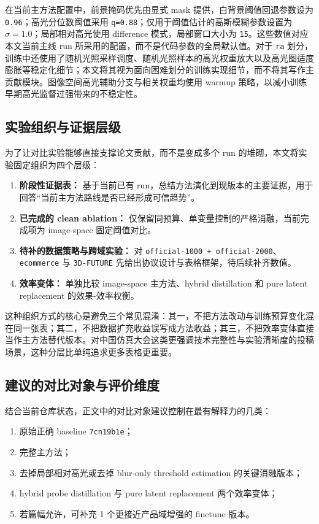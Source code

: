 \documentclass[UTF8,a4paper]{ctexart}
\begin{document}
在当前主方法配置中，前景掩码优先由显式 mask 提供，白背景阈值回退参数设为 \texttt{0.96}；高光分位数阈值采用 \texttt{q=0.88}；仅用于阈值估计的高斯模糊参数设置为 $\sigma=1.0$；局部相对高光使用 difference 模式，局部窗口大小为 \texttt{15}。这些数值对应本文当前主线 run 所采用的配置，而不是代码参数的全局默认值。对于 \texttt{ra} 划分，训练中还使用了随机光照采样调度、随机光照样本的高光权重放大以及高光图适度膨胀等稳定化细节；本文将其视为面向困难划分的训练实现细节，而不将其写作主贡献模块。图像空间高光辅助分支与相关权重均使用 warmup 策略，以减小训练早期高光监督过强带来的不稳定性。

\subsection{实验组织与证据层级}

为了让对比实验能够直接支撑论文贡献，而不是变成多个 run 的堆砌，本文将实验固定组织为四个层级：

\begin{enumerate}
\item \textbf{阶段性证据表：} 基于当前已有 run，总结方法演化到现版本的主要证据，用于回答“当前主方法路线是否已经形成可信趋势”。
\item \textbf{已完成的 clean ablation：} 仅保留同预算、单变量控制的严格消融，当前完成项为 image-space 固定阈值对比。
\item \textbf{待补的数据策略与跨域实验：} 对 \texttt{official-1000 + official-2000}、\texttt{ecommerce} 与 \texttt{3D-FUTURE} 先给出协议设计与表格框架，待后续补齐数值。
\item \textbf{效率变体：} 单独比较 image-space 主方法、hybrid distillation 和 pure latent replacement 的效果-效率权衡。
\end{enumerate}

这种组织方式的核心是避免三个常见混淆：其一，不把方法改动与训练预算变化混在同一张表；其二，不把数据扩充收益误写成方法收益；其三，不把效率变体直接当作主方法替代版本。对中国仿真大会这类更强调技术完整性与实验清晰度的投稿场景，这种分层比单纯追求更多表格更重要。

\subsection{建议的对比对象与评价维度}

结合当前仓库状态，正文中的对比对象建议控制在最有解释力的几类：

\begin{enumerate}
\item 原始正确 baseline \texttt{7cn19b1e}；
\item 完整主方法；
\item 去掉局部相对高光或去掉 blur-only threshold estimation 的关键消融版本；
\item hybrid probe distillation 与 pure latent replacement 两个效率变体；
\item 若篇幅允许，可补充 1 个更接近产品域增强的 finetune 版本。
\end{enumerate}
\end{document}
